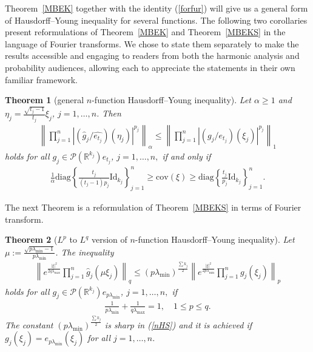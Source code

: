 \documentclass[9pt, a4paper]{amsart}
\newcommand{\1}{{\chi_{}}}%
\newtheorem{theorem}{Theorem}
\numberwithin{equation}{section}
\begin{document}
Theorem~\ref{MBEK} together with the identity (\ref{forfur}) will give us a general form  of Hausdorff--Young inequality for several functions. The following two corollaries present reformulations of Theorem~\ref{MBEK} and Theorem~\ref{MBEKS} in the language of Fourier transforms. We chose to state them separately to make the results accessible and engaging to readers from both the harmonic analysis and probability audiences, allowing each to appreciate the statements in their own familiar framework.


\begin{theorem}[general $n$-function Hausdorff--Young inequality]\label{nhsin}
 Let $\alpha\geq 1$ and $\eta_{j} = \frac{\sqrt{t_{j}-1}}{t_{j}} \xi_{j} $, $j=1, \ldots, n$.   Then 	
		\begin{align}\label{hutRATIOineq}
			\left\|\prod_{j=1}^{n} \left|(\widehat{g}_{j}/ \widehat{e_{t_{j}}})(\eta_{j})\right|^{p_{j}}\right\|_{\alpha} \leq \left\|\prod_{j=1}^{n} \left|(g_{j}/ e_{t_{j}})(\xi_{j})\right|^{p_{j}}\right\|_{1}
		\end{align}
		holds for all $g_{j}\in \mathcal{P}(\mathbb{R}^{k_{j}}) e_{t_{j}}$, $j=1, \ldots, n,$ if and only if
        \begin{align}\label{MBEKloc1}
\frac{1}{\alpha}\mathrm{diag}\left\{ \frac{t_{j}}{(t_{j}-1)p_{j}}\mathrm{Id}_{k_{j}} \right\}_{j=1}^{n} \geq \mathrm{cov}(\xi) \geq \mathrm{diag}\left\{ \frac{t_{j}}{p_{j}}\mathrm{Id}_{k_{j}} \right\}_{j=1}^{n}.
        \end{align}
\end{theorem}
The next Theorem is a reformulation of Theorem~\ref{MBEKS} in terms of Fourier transform. 
\begin{theorem}[$L^{p}$ to $L^{q}$ version of  $n$-function Hausdorff--Young inequality]\label{pqHS}
Let  $\mu := \frac{\sqrt{p\lambda_{\min}-1}}{p\lambda_{\min}}$.    The inequality 
   		\begin{align}\label{nHS}
			\left\|e^{\frac{|\xi|^{2}}{2q \lambda_{\max}}}\prod_{j=1}^{n} \widehat{g}_{j}(\mu \xi_{j})\right\|_{q} \leq (p\lambda_{\min})^{\frac{\sum k_{j}}{2}} \left\|e^{\frac{|\xi|^{2}}{2p \lambda_{\min}}} \prod_{j=1}^{n} g_{j}(\xi_{j})\right\|_{p}
		\end{align}
   holds for all $g_{j}\in \mathcal{P}(\mathbb{R}^{k_{j}}) e_{p \lambda_{\min}}$, $j=1, \ldots, n,$ if
    \begin{align*}
        \frac{1}{p \lambda_{\min}} + \frac{1}{q \lambda_{\max}}=1, \quad 1\leq p\leq q. 
    \end{align*}
    The constant $(p\lambda_{\min})^{\frac{\sum k_{j}}{2}}$ is sharp in (\ref{nHS}) and it is achieved if   $g_{j}(\xi_{j})=e_{p \lambda_{\min}}(\xi_{j})$ for all $j=1, \ldots, n$. 
    
\end{theorem}
\end{document}
